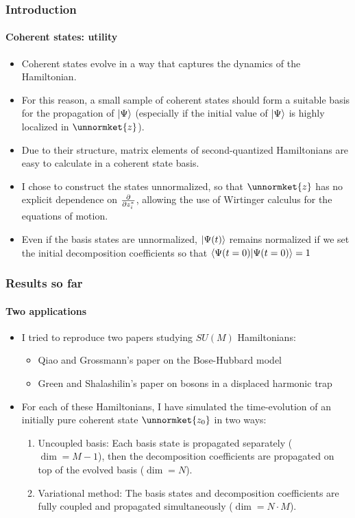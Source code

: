 \documentclass[english]{beamer}
\begin{document}
  
  
  \begin{frame}
  	\frametitle{Introduction}
  	\framesubtitle{Coherent states: utility}
  	\begin{itemize}
  		\item Coherent states evolve in a way that captures the dynamics of the Hamiltonian.
  		\item For this reason, a small sample of coherent states should form a suitable basis for the propagation of $\ket{\Psi}$ (especially if the initial value of $\ket{\Psi}$ is highly localized in $\unnormket{z}$).
  		\item Due to their structure, matrix elements of second-quantized Hamiltonians are easy to calculate in a coherent state basis.
  		\item I chose to construct the states unnormalized, so that $\unnormket{z}$ has no explicit dependence on $\pdv{z^*_i}$, allowing the use of Wirtinger calculus for the equations of motion.
  		\item Even if the basis states are unnormalized, $\ket{\Psi (t)}$ remains normalized if we set the initial decomposition coefficients so that $\braket{\Psi(t=0)}{\Psi(t=0)}=1$
  	\end{itemize}
  	
  \end{frame}
  
  \begin{frame}
  	\frametitle{Results so far}
  	\framesubtitle{Two applications}
  	\begin{itemize}
  		\item I tried to reproduce two papers studying $SU(M)$ Hamiltonians:
  		\begin{itemize}
  			\item Qiao and Grossmann's paper on the Bose-Hubbard model
  			\item Green and Shalashilin's paper on bosons in a displaced harmonic trap
  		\end{itemize}
  		\item For each of these Hamiltonians, I have simulated the time-evolution of an initially pure coherent state $\unnormket{z_0}$ in two ways:
  		\begin{enumerate}
  			\item Uncoupled basis: Each basis state is propagated separately ($\dim = M-1$), then the decomposition coefficients are propagated on top of the evolved basis ($\dim = N$).
  			\item Variational method: The basis states and decomposition coefficients are fully coupled and propagated simultaneously ($\dim = N\cdot M$).
		\end{enumerate}	 
  	\end{itemize}
  \end{frame}
  
\end{document}
